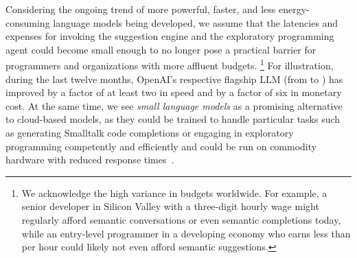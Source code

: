 \ParSep

Considering the ongoing trend of more powerful, faster, and less energy-consuming language models being developed, we assume that the latencies and expenses for invoking the suggestion engine and the exploratory programming agent could become small enough to no longer pose a practical barrier for programmers and organizations with more affluent budgets.%
\footnote{We acknowledge the high variance in budgets worldwide. For example, a senior developer in Silicon Valley with a three-digit hourly wage might regularly afford semantic conversations or even semantic completions today, while an entry-level programmer in a developing economy who earns less than  per hour could likely not even afford semantic suggestions.}
For illustration, during the last twelve months, OpenAI's respective flagship LLM (from  to ) has improved by a factor of at least two in speed and by a factor of six in monetary cost.
At the same time, we see \emph{small language models} as a promising alternative to cloud-based models, as they could be trained to handle particular tasks such as generating Smalltalk code completions or engaging in exploratory programming competently and efficiently and could be run on commodity hardware with reduced response times~\cite{magister2023teaching}.
